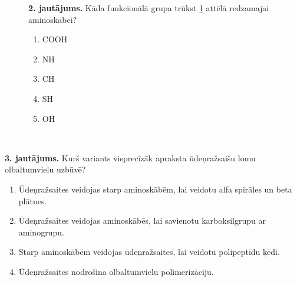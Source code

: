 \documentclass[12pt,a4paper]{article}
\begin{document}
\begin{figure}[h]
    \centering
    \begin{minipage}[c]{0.55\textwidth} %
        \textbf{2. jautājums.} Kāda funkcionālā grupa trūkst \ref{fig:grupa} attēlā redzamajai aminoskābei?

        \begin{enumerate}[label=\Alph*.]
            \item COOH
            \item NH
            \item CH
            \item SH
            \item OH
        \end{enumerate}
    \end{minipage}%
    \hfill
    \begin{minipage}[c]{0.40\textwidth} %
        \centering
        \caption{~}
        \label{fig:grupa}
    \end{minipage}
\end{figure}


\noindent \textbf{3. jautājums.} Kurš variants visprecīzāk apraksta ūdeņražsaišu lomu olbaltumvielu uzbūvē?

\begin{enumerate}[label=\Alph*.]
    \item  Ūdeņražsaites veidojas starp aminoskābēm, lai veidotu alfa spirāles un beta plātnes. 
    \item Ūdeņražsaites veidojas aminoskābēs, lai savienotu karboksilgrupu ar aminogrupu.
    \item Starp aminoskābēm veidojas ūdeņražsaites, lai veidotu polipeptīdu ķēdi.
    \item Ūdeņražsaites nodrošina olbaltumvielu polimerizāciju.
\end{enumerate}
\end{document}
